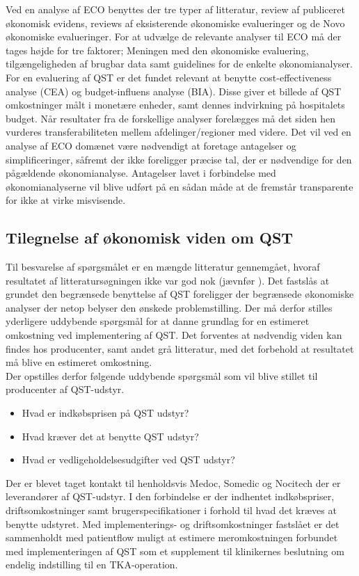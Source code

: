 Ved en analyse af ECO benyttes der tre typer af litteratur, review af publiceret økonomisk evidens, reviews af eksisterende økonomiske evalueringer og de Novo økonomiske evalueringer. For at udvælge de relevante analyser til ECO må der tages højde for tre faktorer; Meningen med den økonomiske evaluering, tilgængeligheden af brugbar data samt guidelines for de enkelte økonomianalyser. For en evaluering af QST er det fundet relevant at benytte cost-effectiveness analyse (CEA) og budget-influens analyse (BIA). Disse giver et billede af QST omkostninger målt i monetære enheder, samt dennes indvirkning på hospitalets budget. Når resultater fra de forskellige analyser forelægges må det siden hen vurderes transferabiliteten mellem afdelinger/regioner med videre. Det vil ved en analyse af ECO domænet være nødvendigt at foretage antagelser og simplificeringer, såfremt der ikke foreligger præcise tal, der er nødvendige for den pågældende økonomianalyse. Antagelser lavet i forbindelse med økonomianalyserne vil blive udført på en sådan måde at de fremstår transparente for ikke at virke misvisende. 


\subsection{Tilegnelse af økonomisk viden om QST}
Til besvarelse af spørgsmålet er en mængde litteratur gennemgået, hvoraf resultatet af litteratursøgningen ikke var god nok (jævnfør ). Det fastslås at grundet den begrænsede benyttelse af QST foreligger der begrænsede økonomiske analyser der netop belyser den ønskede problemstilling. Der må derfor stilles yderligere uddybende spørgsmål for at danne grundlag for en estimeret omkostning ved implementering af QST. Det forventes at nødvendig viden kan findes hos producenter, samt andet grå litteratur, med det forbehold at resultatet må blive en estimeret omkostning.\\ 
Der opstilles derfor følgende uddybende spørgsmål som vil blive stillet til producenter af QST-udstyr.


\begin{itemize}  
\item Hvad er indkøbsprisen på QST udstyr? 
\item Hvad kræver det at benytte QST udstyr? 
\item Hvad er vedligeholdelsesudgifter ved QST udstyr?
\end{itemize}


Der er blevet taget kontakt til henholdsvis Medoc, Somedic og Nocitech der er leverandører af QST-udstyr. I den forbindelse er der indhentet indkøbspriser, driftsomkostninger samt brugerspecifikationer i forhold til hvad det kræves at benytte udstyret. Med implementerings- og driftsomkostninger fastslået er det sammenholdt med patientflow muligt at estimere meromkostningen forbundet med implementeringen af QST som et supplement til klinikernes beslutning om endelig indstilling til en TKA-operation. 


